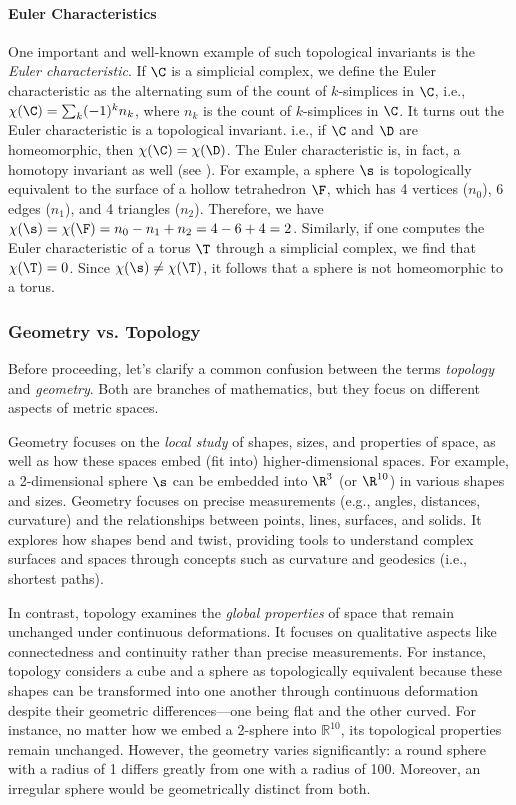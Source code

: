 \paragraph*{Euler Characteristics} One important and well-known example of such topological invariants is the {\em Euler characteristic}. If $\C$ is a simplicial complex, we define the Euler characteristic as the alternating sum of the count of $k$-simplices in $\C$, i.e., $\chi(\C) = \sum_k (-1)^k n_k$, where $n_k$ is the count of $k$-simplices in $\C$. It turns out the Euler characteristic is a topological invariant. i.e., if $\C$ and $\D$ are homeomorphic, then $\chi(\C) = \chi(\D)$. The Euler characteristic is, in fact, a homotopy invariant as well (see \cite{hatcher2002algebraic}). For example, a sphere $\s$ is topologically equivalent to the surface of a hollow tetrahedron $\F$, which has 4 vertices ($n_0$), 6 edges ($n_1$), and 4 triangles ($n_2$). Therefore, we have $\chi(\s) = \chi(\F) = n_0 - n_1 + n_2 = 4 - 6 + 4 = 2$. Similarly, if one computes the Euler characteristic of a torus $\T$ through a simplicial complex, we find that $\chi(\T) = 0$. Since $\chi(\s) \neq \chi(\T)$, it follows that a sphere is not homeomorphic to a torus.

 

\subsubsection{Geometry vs. Topology} Before proceeding, let's clarify a common confusion between the terms \textit{topology} and \textit{geometry}. Both are branches of mathematics, but they focus on different aspects of metric spaces.

Geometry focuses on the \textit{local study} of shapes, sizes, and properties of space, as well as how these spaces embed (fit into) higher-dimensional spaces.  For example, a 2-dimensional sphere $\s$ can be embedded into $\R^3$ (or $\R^{10}$) in various shapes and sizes.
Geometry focuses on precise measurements (e.g., angles, distances, curvature) and the relationships between points, lines, surfaces, and solids. It explores how shapes bend and twist, providing tools to understand complex surfaces and spaces through concepts such as curvature and geodesics (i.e., shortest paths).

In contrast, topology examines the \textit{global properties} of space that remain unchanged under continuous deformations. It focuses on qualitative aspects like connectedness and continuity rather than precise measurements. For instance, topology considers a cube and a sphere as topologically equivalent because these shapes can be transformed into one another through continuous deformation despite their geometric differences—one being flat and the other curved. For instance, no matter how we embed a 2-sphere into $\mathbb{R}^{10}$, its topological properties remain unchanged. However, the geometry varies significantly: a round sphere with a radius of 1 differs greatly from one with a radius of 100. Moreover, an irregular sphere would be geometrically distinct from both. 

